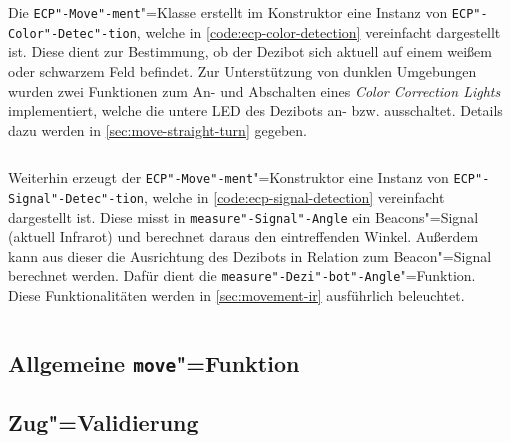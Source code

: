 
Die \texttt{ECP"-Move"-ment}"=Klasse erstellt im Konstruktor eine Instanz von \texttt{ECP"-Color"-Detec"-tion}, welche in \autoref{code:ecp-color-detection} vereinfacht dargestellt ist. Diese dient zur Bestimmung, ob der Dezibot sich aktuell auf einem weißem oder schwarzem Feld befindet. Zur Unterstützung von dunklen Umgebungen wurden zwei Funktionen zum An- und Abschalten eines \emph{Color Correction Lights} implementiert, welche die untere LED des Dezibots an- bzw. ausschaltet. Details dazu werden in \autoref{sec:move-straight-turn} gegeben.

\begin{listing}[h]
    \inputminted{cpp}{../assets/code/ECPColorDetection.cpp}
    \caption{Vereinfachter Code"=Ausschnitt zur \texttt{ECP"-Color"-Detec"-tion}"=Klasse}
    \label{code:ecp-color-detection}
\end{listing}


Weiterhin erzeugt der \texttt{ECP"-Move"-ment}"=Konstruktor eine Instanz von \texttt{ECP"-Signal"-Detec"-tion}, welche in \autoref{code:ecp-signal-detection} vereinfacht dargestellt ist. Diese misst in \texttt{measure"-Signal"-Angle} ein Beacons"=Signal (aktuell Infrarot) und berechnet daraus den eintreffenden Winkel. Außerdem kann aus dieser die Ausrichtung des Dezibots in Relation zum Beacon"=Signal berechnet werden. Dafür dient die \texttt{measure"-Dezi"-bot"-Angle}"=Funktion. Diese Funktionalitäten werden in \autoref{sec:movement-ir} ausführlich beleuchtet.

\begin{listing}[h]
    \inputminted{cpp}{../assets/code/ECPSignalDetection.cpp}
    \caption{Vereinfachter Code"=Ausschnitt zur \texttt{ECP"-Signal"-Detec"-tion}"=Klasse}
    \label{code:ecp-signal-detection}
\end{listing}


\subsection{Allgemeine \texttt{move}"=Funktion}
\label{sec:general-move-function}


\subsection{Zug"=Validierung}
\label{sec:move-validation}
